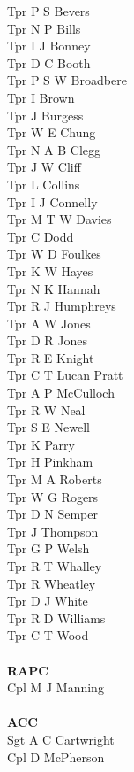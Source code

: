 \begin{multicols}{2}
  Tpr P S Bevers \\
  Tpr N P Bills \\
  Tpr I J Bonney \\
  Tpr D C Booth \\
  Tpr P S W Broadbere \\
  Tpr I Brown \\
  Tpr J Burgess \\
  Tpr W E Chung \\
  Tpr N A B Clegg \\
  Tpr J W Cliff \\
  Tpr L Collins \\
  Tpr I J Connelly \\
  Tpr M T W Davies \\
  Tpr C Dodd \\
  Tpr W D Foulkes \\
  Tpr K W Hayes \\
  Tpr N K Hannah \\
  Tpr R J Humphreys \\
  Tpr A W Jones \\
  Tpr D R Jones \\
  Tpr R E Knight \\
  Tpr C T Lucan Pratt \\
  Tpr A P McCulloch \\
  Tpr R W Neal \\
  Tpr S E Newell \\
  Tpr K Parry \\
  Tpr H Pinkham \\
  Tpr M A Roberts \\
  Tpr W G Rogers \\
  Tpr D N Semper \\
  Tpr J Thompson \\
  Tpr G P Welsh \\
  Tpr R T Whalley \\
  Tpr R Wheatley \\
  Tpr D J White \\
  Tpr R D Williams \\
  Tpr C T Wood \\
  \\
  \textbf{RAPC} \\
  Cpl M J Manning \\
  \\
  \textbf{ACC} \\
  Sgt A C Cartwright \\
  Cpl D McPherson \\

\end{multicols}

